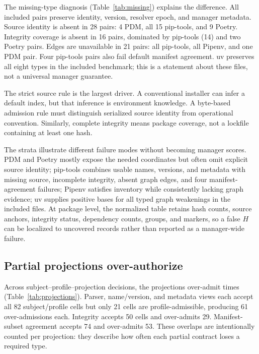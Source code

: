 \documentclass[10pt,conference]{IEEEtran}
\begin{document}
\begin{table}[t]
\caption{Benchmark composition and profile outcomes. Fractions are read within each row; they are benchmark coverage facts, not manager rankings.}
\centering\small

\label{tab:profiles}
\end{table}

The missing-type diagnosis (Table~\ref{tab:missing}) explains the difference. All included pairs preserve identity, version, resolver epoch, and manager metadata. Source identity is absent in 28 pairs: 4 PDM, all 15 pip-tools, and 9 Poetry. Integrity coverage is absent in 16 pairs, dominated by pip-tools (14) and two Poetry pairs. Edges are unavailable in 21 pairs: all pip-tools, all Pipenv, and one PDM pair. Four pip-tools pairs also fail default manifest agreement. uv preserves all eight types in the included benchmark; this is a statement about these files, not a universal manager guarantee.

\begin{table}[t]
\caption{Selected missing evidence types for the graph profile. Lower counts indicate fewer observed gaps for that type in the included files; bold zeros mark no observed gap.}
\centering\small

\label{tab:missing}
\end{table}

The strict source rule is the largest driver. A conventional installer can infer a default index, but that inference is environment knowledge. A byte-based admission rule must distinguish serialized source identity from operational convention. Similarly, complete integrity means package coverage, not a lockfile containing at least one hash.

The strata illustrate different failure modes without becoming manager scores. PDM and Poetry mostly expose the needed coordinates but often omit explicit source identity; pip-tools combines usable names, versions, and metadata with missing source, incomplete integrity, absent graph edges, and four manifest-agreement failures; Pipenv satisfies inventory while consistently lacking graph evidence; uv supplies positive bases for all typed graph weakenings in the included files. At package level, the normalized table retains hash counts, source anchors, integrity status, dependency counts, groups, and markers, so a false $H$ can be localized to uncovered records rather than reported as a manager-wide failure.

\subsection{Partial projections over-authorize}
Across \ProjectionDecisions{} subject--profile--projection decisions, the projections over-admit \ProjectionOver{} times (Table~\ref{tab:projections}). Parser, name/version, and metadata views each accept all 82 subject/profile cells but only 21 cells are profile-admissible, producing 61 over-admissions each. Integrity accepts 50 cells and over-admits 29. Manifest-subset agreement accepts 74 and over-admits 53. These overlaps are intentionally counted per projection: they describe how often each partial contract loses a required type.
\end{document}
